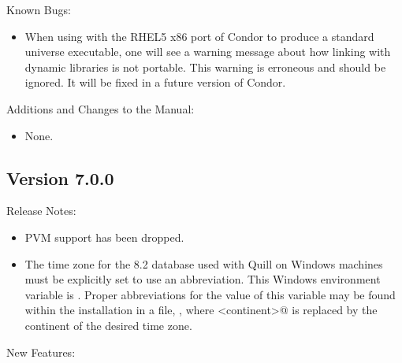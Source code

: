 \noindent Known Bugs:

\begin{itemize}

\item When using  with the RHEL5 x86 port of Condor to
produce a standard universe executable, one will see a warning message
about how linking with dynamic libraries is not portable. This warning
is erroneous and should be ignored. It will be fixed in a future version
of Condor.

\end{itemize}

\noindent Additions and Changes to the Manual:

\begin{itemize}

\item None.

\end{itemize}


\subsection*{\label{sec:New-7-0-0}Version 7.0.0}

\noindent Release Notes:

\begin{itemize}

\item PVM support has been dropped.

\item The time zone for the  8.2 database
  used with Quill on Windows machines must be explicitly set
  to use an abbreviation.
  This Windows environment variable is \verb@TZ@.
  Proper abbreviations for the value of this variable may be found
  within the  installation in a file,
  , where
  \verb@<continent>@ is replaced by the continent of the 
  desired time zone.

\end{itemize}


\noindent New Features:

